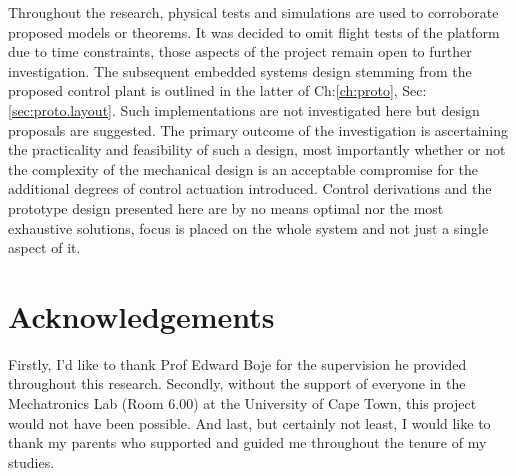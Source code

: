 \documentclass[a4paper, 11pt, oneside, openright, parskip=full]{book}
\begin{document}
\par
Throughout the research, physical tests and simulations are used to corroborate proposed models or theorems. It was decided to omit flight tests of the platform due to time constraints, those aspects of the project remain open to further investigation. The subsequent embedded systems design stemming from the proposed control plant is outlined in the latter of Ch:\ref{ch:proto}, Sec:\ref{sec:proto.layout}. Such implementations are not investigated here but design proposals are suggested. The primary outcome of the investigation is ascertaining the practicality and feasibility of such a design, most importantly whether or not the complexity of the mechanical design is an acceptable compromise for the additional degrees of control actuation introduced. Control derivations and the prototype design presented here are by no means optimal nor the most exhaustive solutions, focus is placed on the whole system and not just a single aspect of it.
\par
\chapter{Acknowledgements}		
\label{ch:ack}
Firstly, I'd like to thank Prof Edward Boje for the supervision he provided throughout this research. Secondly, without the support of everyone in the Mechatronics Lab (Room 6.00) at the University of Cape Town, this project would not have been possible. And last, but certainly not least, I would like to thank my parents who supported and guided me throughout the tenure of my studies. 
\end{document}
